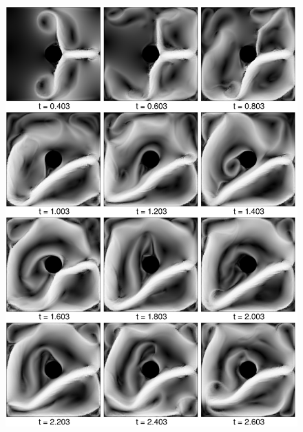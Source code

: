 \begin{figure}[htbp]
    \includegraphics[width=\textwidth]{figures/navier_stokes/navier_1.png}
    \label{navier_1}
\end{figure}


